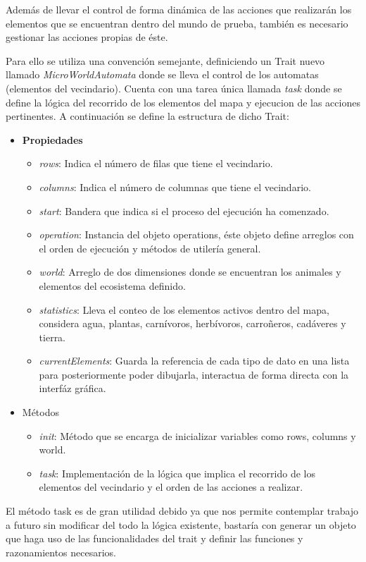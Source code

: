     Además de llevar el control de forma dinámica de las acciones que realizarán los elementos que se encuentran dentro del mundo de prueba, también es necesario gestionar las acciones propias de éste.

    Para ello se utiliza una convención semejante, definiciendo un Trait nuevo llamado \textit{MicroWorldAutomata} donde se lleva el control de los automatas (elementos del vecindario). Cuenta con una tarea única llamada \textit{task} donde se define la lógica del recorrido de los elementos del mapa y ejecucion de las acciones pertinentes. A continuación se define la estructura de dicho Trait:

      \begin{itemize}
        \item{\textbf{Propiedades}}
            \begin{itemize}
              \item{\textit{rows}: Indica el número de filas que tiene el vecindario.}
              \item{\textit{columns}: Indica el número de columnas que tiene el vecindario.}
              \item{\textit{start}: Bandera que indica si el proceso del ejecución ha comenzado.}
              \item{\textit{operation}: Instancia del objeto operations, éste objeto define arreglos con el orden de ejecución y métodos de utilería general.}
              \item{\textit{world}: Arreglo de dos dimensiones donde se encuentran los animales y elementos del ecosistema definido.}
              \item{\textit{statistics}: Lleva el conteo de los elementos activos dentro del mapa, considera agua, plantas, carnívoros, herbívoros, carroñeros, cadáveres y tierra.}
              \item{\textit{currentElements}: Guarda la referencia de cada tipo de dato en una lista para posteriormente poder dibujarla, interactua de forma directa con la interfáz gráfica.}
            \end{itemize}
          \item{Métodos}
            \begin{itemize}            
              \item{\textit{init}: Método que se encarga de inicializar variables como rows, columns y world.}
              \item{\textit{task}: Implementación de la lógica que implica el recorrido de los elementos del vecindario y el orden de las acciones a realizar.}            
            \end{itemize}        
      \end{itemize}
    El método task es de gran utilidad debido ya que nos permite contemplar trabajo a futuro sin modificar del todo la lógica existente, bastaría con generar un objeto que haga uso de las funcionalidades del trait y definir las funciones y razonamientos necesarios.

